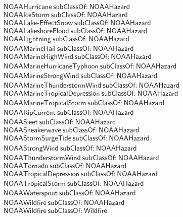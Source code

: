 \begin{align}
  \textsf{NOAAHurricane}~\textsf{subClassOf:}~\textsf{NOAAHazard}\\
  \textsf{NOAAIceStorm}~\textsf{subClassOf:}~\textsf{NOAAHazard}\\
  \textsf{NOAALake-EffectSnow}~\textsf{subClassOf:}~\textsf{NOAAHazard}\\
  \textsf{NOAALakeshoreFlood}~\textsf{subClassOf:}~\textsf{NOAAHazard}\\
  \textsf{NOAALightning}~\textsf{subClassOf:}~\textsf{NOAAHazard}\\
  \textsf{NOAAMarineHail}~\textsf{subClassOf:}~\textsf{NOAAHazard}\\
  \textsf{NOAAMarineHighWind}~\textsf{subClassOf:}~\textsf{NOAAHazard}\\
  \textsf{NOAAMarineHurricaneTyphoon}~\textsf{subClassOf:}~\textsf{NOAAHazard}\\
  \textsf{NOAAMarineStrongWind}~\textsf{subClassOf:}~\textsf{NOAAHazard}\\
  \textsf{NOAAMarineThunderstormWind}~\textsf{subClassOf:}~\textsf{NOAAHazard}\\
  \textsf{NOAAMarineTropicalDepression}~\textsf{subClassOf:}~\textsf{NOAAHazard}\\
  \textsf{NOAAMarineTropicalStorm}~\textsf{subClassOf:}~\textsf{NOAAHazard}\\
  \textsf{NOAARipCurrent}~\textsf{subClassOf:}~\textsf{NOAAHazard}\\
  \textsf{NOAASleet}~\textsf{subClassOf:}~\textsf{NOAAHazard}\\
  \textsf{NOAASneakerwave}~\textsf{subClassOf:}~\textsf{NOAAHazard}\\
  \textsf{NOAAStormSurgeTide}~\textsf{subClassOf:}~\textsf{NOAAHazard}\\
  \textsf{NOAAStrongWind}~\textsf{subClassOf:}~\textsf{NOAAHazard}\\
  \textsf{NOAAThunderstormWind}~\textsf{subClassOf:}~\textsf{NOAAHazard}\\
  \textsf{NOAATornado}~\textsf{subClassOf:}~\textsf{NOAAHazard}\\
  \textsf{NOAATropicalDepression}~\textsf{subClassOf:}~\textsf{NOAAHazard}\\
  \textsf{NOAATropicalStorm}~\textsf{subClassOf:}~\textsf{NOAAHazard}\\
  \textsf{NOAAWaterspout}~\textsf{subClassOf:}~\textsf{NOAAHazard}\\
  \textsf{NOAAWildfire}~\textsf{subClassOf:}~\textsf{NOAAHazard}\\
  \textsf{NOAAWildfire}~\textsf{subClassOf:}~\textsf{Wildfire}\\

\end{align}
